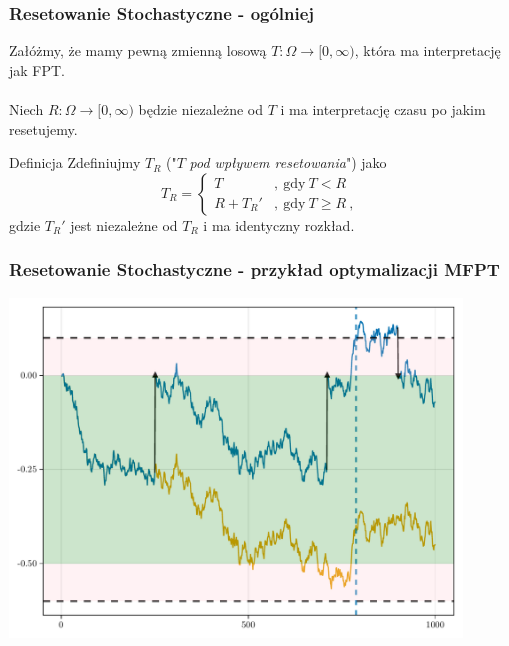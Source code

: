 \documentclass{beamer}
\newcommand{\1}{\mathbb{1}}
\begin{document}
\begin{frame}
\frametitle{Resetowanie Stochastyczne - ogólniej}
Załóżmy, że mamy pewną zmienną losową $T:\Omega \to [0, \infty)$, która ma interpretację jak FPT. \\~\\
\pause
Niech $R:\Omega \to [0, \infty)$ będzie niezależne od $T$ i ma interpretację czasu po jakim resetujemy.
\pause
\begin{block}{Definicja}
Zdefiniujmy\footnotemark{} $T_R$ ("$T$ \emph{pod wpływem resetowania}") jako
\begin{equation}
T_R = \begin{cases}
T &,~\text{gdy}~ T < R \\
R + T_R' &,~\text{gdy}~ T \ge R~,
\end{cases}
\end{equation}
gdzie $T_R'$ jest niezależne od $T_R$ i ma identyczny rozkład.
\end{block}

\end{frame}

\begin{frame}
\frametitle{Resetowanie Stochastyczne - przykład optymalizacji MFPT}
\includegraphics[width=0.9\textwidth]{wiener-sim/tr-resetting-reg.pdf}
\end{frame}
\end{document}
